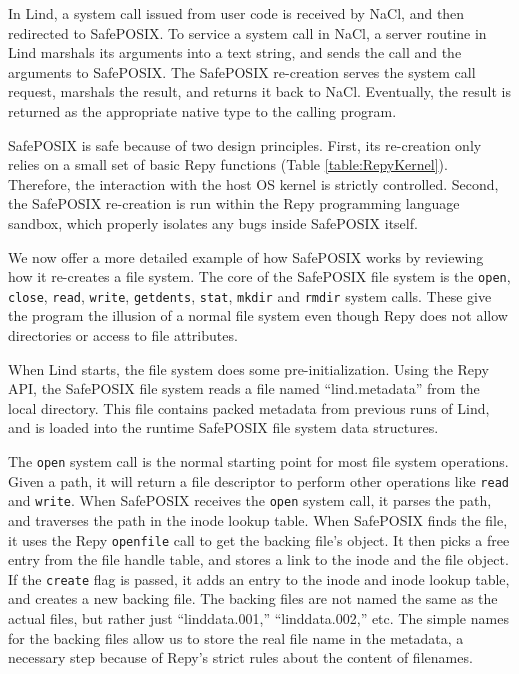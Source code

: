 In Lind, a system call issued from user code is
received by NaCl, and then redirected to SafePOSIX.
To service a system call in NaCl, a server routine in
Lind marshals its arguments into a text string, and sends the call and the arguments
to SafePOSIX. The SafePOSIX re-creation serves the system call request, marshals the result, and
returns it back to NaCl. Eventually, the result is returned as the appropriate
native type to the calling program.

SafePOSIX is safe because of two design principles.
First, its re-creation only relies on a small set of basic Repy functions (Table \ref{table:RepyKernel}).
Therefore, the interaction with the host OS kernel is strictly controlled.
Second, the SafePOSIX re-creation is run within the Repy programming language sandbox,
which properly isolates any bugs inside SafePOSIX itself.

We now offer a more detailed example of how SafePOSIX works by reviewing how it re-creates a file system. 
The core of the SafePOSIX file system is the \texttt{open}, \texttt{close}, \texttt{read}, \texttt{write},
\texttt{getdents}, \texttt{stat}, \texttt{mkdir} and \texttt{rmdir} system calls.
These give the program the illusion of a normal file system even though Repy does not allow directories or access to file attributes.

When Lind starts, the file system does some pre-initialization. Using the Repy API, the SafePOSIX file system reads a file named ``lind.metadata''
from the local directory. This file contains packed metadata from previous runs of Lind,
and is loaded into the runtime SafePOSIX file system data structures.

The \texttt{open} system call is the normal starting point for most file system operations.
Given a path, it will return a file descriptor to perform other operations like \texttt{read} and \texttt{write}.
When SafePOSIX receives the \texttt{open} system call, it parses the path, and
traverses the path in the inode lookup table.
When SafePOSIX finds the file, it uses the Repy \texttt{openfile} call to get the backing file's object.
It then picks a free entry from the file handle table, and stores a link to the inode and the file object.
If the \texttt{create} flag is passed, it adds an entry to the inode and inode lookup table, and creates a new backing file.
The backing files are not named the same as the actual files, but rather just ``linddata.001,'' ``linddata.002,'' etc.
The simple names for the backing files allow us to store the real file name in the metadata, a
necessary step because of Repy's strict rules about the content of filenames.

